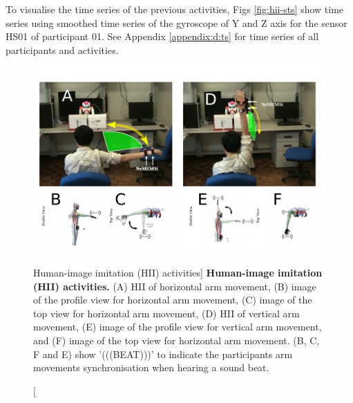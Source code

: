 To visualise the time series of the previous activities, Figs 
\ref{fig:hii-sts} show time series using smoothed time series 
of the gyroscope of Y and Z axis 
for the sensor HS01 of participant 01.
See Appendix \ref{appendix:d:ts} for 
time series of all participants and activities. 
\begin{figure}
  \centering
  \includegraphics[width=1.0\textwidth]{hii}
    \caption
	[Human-image imitation (HII) activities]{
	{\bf Human-image imitation (HII) activities.} 
		(A) HII of horizontal arm movement, 
		(B) image of the profile view for horizontal arm movement,
		(C) image of the top view for horizontal arm movement,
		(D) HII of vertical arm movement, 
		(E) image of the profile view for vertical arm movement, and
		(F) image of the top view for horizontal arm movement.
		(B, C, F and E) show '(((BEAT)))' to indicate the participants
		arm movements synchronisation when hearing a sound beat.
        }
    \label{fig:hii}
\end{figure}
